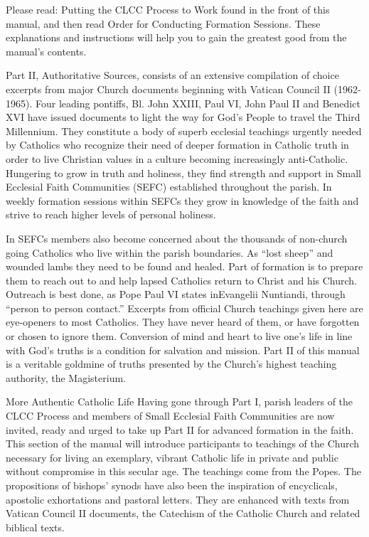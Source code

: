 \documentclass[oneside]{book}
\begin{document}
Please read: Putting the CLCC Process to Work found in the front of this manual,
and then read Order for Conducting Formation Sessions. These explanations and
instructions will help you to gain the greatest good from the manual's contents.

Part II, Authoritative Sources, consists of an extensive compilation of choice
excerpts from major Church documents beginning with Vatican Council II
(1962-1965). Four leading pontiffs, Bl. John XXIII, Paul VI, John Paul II and
Benedict XVI have issued documents to light the way for God's People to travel
the Third Millennium. They constitute a body of superb ecclesial teachings
urgently needed by Catholics who recognize their need of deeper formation in
Catholic truth in order to live Christian values in a culture becoming
increasingly anti-Catholic. Hungering to grow in truth and holiness, they find
strength and support in Small Ecclesial Faith Communities (SEFC) established
throughout the parish. In weekly formation sessions within SEFCs they grow in
knowledge of the faith and strive to reach higher levels of personal holiness.

In SEFCs members also become concerned about the thousands of non-church going
Catholics who live within the parish boundaries. As ``lost sheep'' and wounded
lambs they need to be found and healed. Part of formation is to prepare them to
reach out to and help lapsed Catholics return to Christ and his Church. Outreach
is best done, as Pope Paul VI states inEvangelii Nuntiandi, through ``person to
person contact.'' Excerpts from official Church teachings given here are
eye-openers to most Catholics. They have never heard of them, or have forgotten
or chosen to ignore them. Conversion of mind and heart to live one's life in
line with God's truths is a condition for salvation and mission. Part II of this
manual is a veritable goldmine of truths presented by the Church's highest
teaching authority, the Magisterium.

More Authentic Catholic Life
Having gone through Part I, parish leaders of the CLCC Process and members of
Small Ecclesial Faith Communities are now invited, ready and urged to take up
Part II for advanced formation in the faith. This section of the manual will
introduce participants to teachings of the Church necessary for living an
exemplary, vibrant Catholic life in private and public without compromise in
this secular age. The teachings come from the Popes. The propositions of
bishops' synods have also been the inspiration of encyclicals, apostolic
exhortations and pastoral letters. They are enhanced with texts from Vatican
Council II documents, the Catechism of the Catholic Church and related biblical
texts.
\end{document}
